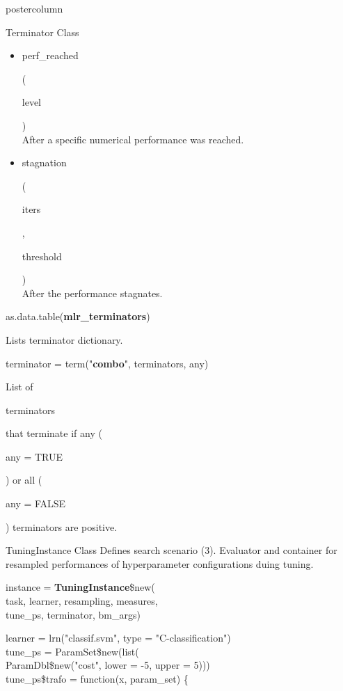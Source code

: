 \documentclass{beamer}
\newcommand{\codeinline}[1]{\begin{codeboxinline}#1\end{codeboxinline}}
\begin{document}
\begin{frame}[fragile]{}
\begin{columns}
\begin{column}{.245\textwidth}
\begin{beamercolorbox}[center]{postercolumn}
\begin{minipage}{.98\textwidth}
{\begin{myblock}{Terminator Class}
\begin{itemize}
								After a given model time.
								\item \codeinline{perf\_reached}
								(\codeinline{level})\\
								After a specific numerical performance was reached.
								\item \codeinline{stagnation}
								(\codeinline{iters}, \codeinline{threshold})\\
								After the performance stagnates.
							\end{itemize}
							\vspace{1em}
							\begin{codebox}
								as.data.table(\textbf{mlr\_terminators})
							\end{codebox}
							Lists terminator dictionary.
							\\
							\begin{codebox}
								terminator = term("\textbf{combo}", terminators, any)
							\end{codebox}
							List of \codeinline{terminators} that terminate 
							if any (\codeinline{any = TRUE}) 
							or all (\codeinline{any = FALSE}) terminators are positive.
						\end{myblock}
						\begin{myblock}{TuningInstance Class}
							Defines search scenario (3). 
							Evaluator 
							and container for resampled performances 
							of hyperparameter configurations duing tuning. 
							\\
							\begin{codeboxmultiline}[width=23.7cm]
								instance = \textbf{TuningInstance}\$new(\\
								\hspace*{1ex}task, learner, resampling, measures,\\
								\hspace*{1ex}tune\_ps, terminator, bm\_args)
							\end{codeboxmultiline}
							\vspace{1em}
							\begin{codeboxexample}
								{\scriptsize
									learner = lrn("classif.svm", type = "C-classification")\\
									tune\_ps = ParamSet\$new(list(\\
									\hspace*{1ex} ParamDbl\$new("cost", lower = -5, upper = 5)))\\
									tune\_ps\$trafo = function(x, param\_set) \{\\
}
\end{codeboxexample}
\end{myblock}}
\end{minipage}
\end{beamercolorbox}
\end{column}
\end{columns}
\end{frame}
\end{document}
